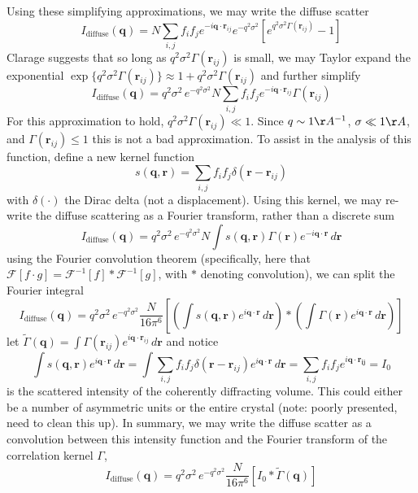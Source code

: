\documentclass{article}
\begin{document}
Using these simplifying approximations, we may write the diffuse scatter
\[
I_\mathrm{diffuse} (\mathbf{q}) = N \sum\limits_{i,j} f_i f_j e^{-i \mathbf{q} \cdot \mathbf{r}_{ij}} 
%
e^{- q^2 \sigma^2}
%
\left[ 
e^{q^2 \sigma^2 \Gamma(\mathbf{r}_{ij})} - 1
\right]
\]
Clarage suggests that so long as $q^2 \sigma^2 \Gamma(\mathbf{r}_{ij})$ is small, we may Taylor expand the exponential $\exp \{ q^2 \sigma^2 \Gamma(\mathbf{r}_{ij}) \} \approx 1 + q^2 \sigma^2 \Gamma(\mathbf{r}_{ij})$ and further simplify
\[
I_\mathrm{diffuse} (\mathbf{q}) = q^2 \sigma^2 \, e^{- q^2 \sigma^2} N 
\sum\limits_{i,j} f_i f_j e^{-i \mathbf{q} \cdot \mathbf{r}_{ij}} \Gamma(\mathbf{r}_{ij})
\]
For this approximation to hold, $q^2 \sigma^2 \Gamma(\mathbf{r}_{ij}) \ll 1$. Since $q \sim 1 \AA^{-1}$, $\sigma \ll 1 \AA$, and $\Gamma(\mathbf{r}_{ij}) \leq 1$ this is not a bad approximation. To assist in the analysis of this function, define a new kernel function
\[
s( \mathbf{q}, \mathbf{r}) = \sum_{i,j} f_i f_j \delta( \mathbf{r} - \mathbf{r}_{ij})
\]
with $\delta(\cdot)$ the Dirac delta (not a displacement). Using this kernel, we may re-write the diffuse scattering as a Fourier transform, rather than a discrete sum
\[
I_\mathrm{diffuse} (\mathbf{q}) = q^2 \sigma^2 \, e^{- q^2 \sigma^2} N 
\int s( \mathbf{q}, \mathbf{r})  \Gamma(\mathbf{r}) e^{-i \mathbf{q} \cdot \mathbf{r}} \, d \mathbf{r}
\]
using the Fourier convolution theorem (specifically, here that $ \mathcal{F}[ f \cdot g ] = \mathcal{F}^{-1}[f] \ast \mathcal{F}^{-1}[g]$, with $\ast$ denoting convolution), we can split the Fourier integral
\[
I_\mathrm{diffuse} (\mathbf{q}) = q^2 \sigma^2 \, e^{- q^2 \sigma^2} \frac{N}{16 \pi^6} 
\left[ \left( \int s( \mathbf{q}, \mathbf{r})  e^{i \mathbf{q} \cdot \mathbf{r}} \, d \mathbf{r} \right) \ast
\left( \int \Gamma(\mathbf{r})   e^{i \mathbf{q} \cdot \mathbf{r}} \, d \mathbf{r} \right) \right]
\]
let $\tilde{\Gamma} (\mathbf{q}) = \int \Gamma(\mathbf{r}_{ij})   e^{i \mathbf{q} \cdot \mathbf{r}_{ij}} \, d \mathbf{r}$ and notice 
\[
\int s( \mathbf{q}, \mathbf{r})  e^{i \mathbf{q} \cdot \mathbf{r}} \, d \mathbf{r} =
%
\int \sum_{i,j} f_i f_j \delta( \mathbf{r} - \mathbf{r}_{ij}) e^{i \mathbf{q} \cdot \mathbf{r}}  \, d \mathbf{r} =
%
\sum_{i,j} f_i f_j e^{i \mathbf{q} \cdot \mathbf{r_{ij}}} = I_0
\]
is the scattered intensity of the coherently diffracting volume. This could either be a number of asymmetric units or the entire crystal (note: poorly presented, need to clean this up). In summary, we may write the diffuse scatter as a convolution between this intensity function and the Fourier transform of the correlation kernel $\Gamma$,
\begin{equation}
I_\mathrm{diffuse} (\mathbf{q}) = q^2 \sigma^2 \, e^{- q^2 \sigma^2} \frac{N}{16 \pi^6} 
\left[ I_0 \ast \tilde{\Gamma}(\mathbf{q}) \right]
\end{equation}
\end{document}
